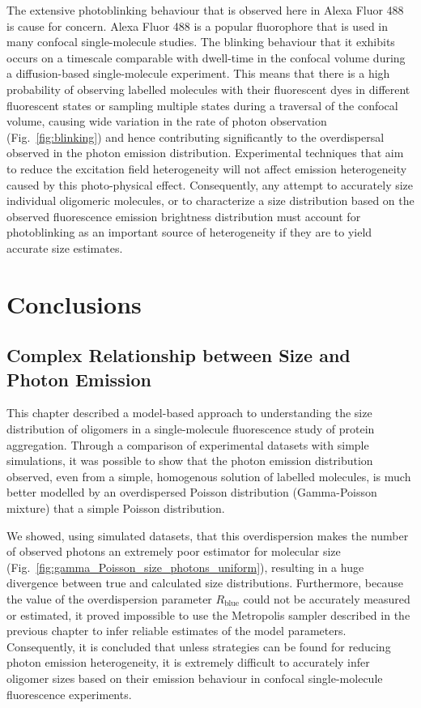 The extensive photoblinking behaviour that is observed here in Alexa Fluor 488 is cause for concern. Alexa Fluor 488 is a popular fluorophore that is used in many confocal single-molecule studies. The blinking behaviour that it exhibits occurs on a timescale comparable with dwell-time in the confocal volume during a diffusion-based single-molecule experiment. This means that there is a high probability of observing labelled molecules with their fluorescent dyes in different fluorescent states or sampling multiple states during a traversal of the confocal volume, causing wide variation in the rate of photon observation (Fig.~\ref{fig:blinking}) and hence contributing significantly to the overdispersal observed in the photon emission distribution. Experimental techniques that aim to reduce the excitation field heterogeneity will not affect emission heterogeneity caused by this photo-physical effect. Consequently, any attempt to accurately size individual oligomeric molecules, or to characterize a size distribution based on the observed fluorescence emission brightness distribution must account for photoblinking as an important source of heterogeneity if they are to yield accurate size estimates.      

\section{Conclusions}
\subsection{Complex Relationship between Size and Photon Emission}
This chapter described a model-based approach to understanding the size distribution of oligomers in a single-molecule fluorescence study of protein aggregation. Through a comparison of experimental datasets with simple simulations, it was possible to show that the photon emission distribution observed, even from a simple, homogenous solution of labelled molecules, is much better modelled by an overdispersed Poisson distribution (Gamma-Poisson mixture) that a simple Poisson distribution.

We showed, using simulated datasets, that this overdispersion makes the number of observed photons an extremely poor estimator for molecular size (Fig.~\ref{fig:gamma_Poisson_size_photons_uniform}), resulting in a huge divergence between true and calculated size distributions. Furthermore, because the value of the overdispersion parameter $R_{\text{blue}}$ could not be accurately measured or estimated, it proved impossible to use the Metropolis sampler described in the previous chapter to infer reliable estimates of the model parameters. Consequently, it is concluded that unless strategies can be found for reducing photon emission heterogeneity, it is extremely difficult to accurately infer oligomer sizes based on their emission behaviour in confocal single-molecule fluorescence experiments.

